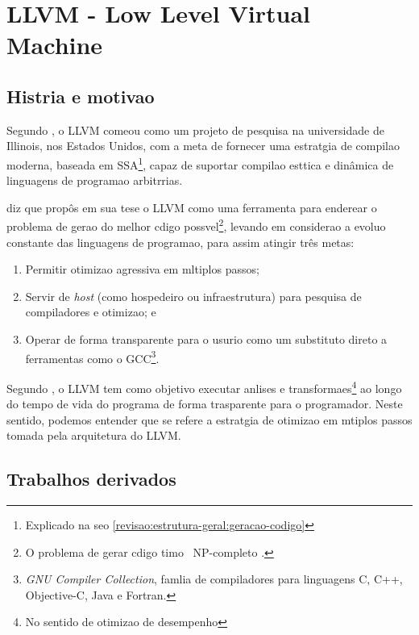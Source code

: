 
\section{LLVM - Low Level Virtual Machine}
\label{revisao:llvm}

\subsection{Hist\oh ria e motiva\ca o}

Segundo \cite{LLVMorg}, o LLVM come\cc ou como um projeto de pesquisa na universidade de Illinois, nos Estados Unidos, com a meta de fornecer uma estrat\eh gia de compila\ca o moderna, baseada em SSA\footnote{Explicado na se\ca o \ref{revisao:estrutura-geral:geracao-codigo}}, capaz de suportar compila\ca o est\ah tica e din\^amica de linguagens de programa\ca o arbitr\ah rias.

\cite{Machado07} diz que \cite{Lattner02} prop\^os em sua tese o LLVM como uma ferramenta para endere\cc ar o problema de gera\ca o do melhor c\oh digo poss\ih vel\footnote{O problema de gerar c\oh digo \oh timo \eh\ NP-completo \cite{Aho08}.}, levando em considera\ca o a evolu\ca o constante das linguagens de programa\ca o, para assim atingir tr\^es metas:

\begin{enumerate}
\item Permitir otimiza\ca o agressiva em m\uh ltiplos passos;
\item Servir de \emph{host} (como hospedeiro ou infraestrutura) para pesquisa de compiladores e otimiza\ca o; e
\item Operar de forma transparente para o usu\ah rio como um substituto direto a ferramentas como o GCC\footnote{\emph{GNU Compiler Collection}, fam\ih lia de compiladores para linguagens C, C++, Objective-C, Java e Fortran.}.
\end{enumerate}

Segundo \cite{Cantu08:1}, o LLVM tem como objetivo executar an\ah lises e transforma\co es\footnote{No sentido de otimiza\ca o de desempenho} ao longo do tempo de vida do programa de forma trasparente para o programador. Neste sentido, podemos entender que se refere a estrat\eh gia de otimiza\ca o em m\uh tiplos passos tomada pela arquitetura do LLVM.

\subsection{Trabalhos derivados}

